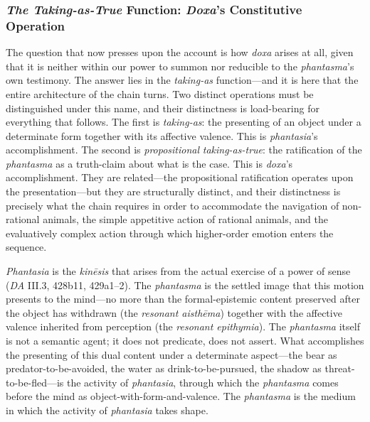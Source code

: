 \documentclass{article}
\begin{document}
\subsubsection*{\textit{The Taking-as-True} Function: \textit{Doxa}'s Constitutive Operation}

The question that now presses upon the account is how \textit{doxa} arises at all, given that it is neither within our power to summon nor reducible to the \textit{phantasma}'s own testimony. The answer lies in the \textit{taking-as} function---and it is here that the entire architecture of the chain turns. Two distinct operations must be distinguished under this name, and their distinctness is load-bearing for everything that follows. The first is \textit{taking-as}: the presenting of an object under a determinate form together with its affective valence. This is \textit{phantasia}'s accomplishment. The second is \textit{propositional} \textit{taking-as-true}: the ratification of the \textit{phantasma} as a truth-claim about what is the case. This is \textit{doxa}'s accomplishment. They are related---the propositional ratification operates upon the presentation---but they are structurally distinct, and their distinctness is precisely what the chain requires in order to accommodate the navigation of non-rational animals, the simple appetitive action of rational animals, and the evaluatively complex action through which higher-order emotion enters the sequence.

\textit{Phantasia} is the \textit{kinēsis} that arises from the actual exercise of a power of sense (\textit{DA} III.3, 428b11, 429a1--2). The \textit{phantasma} is the settled image that this motion presents to the mind---no more than the formal-epistemic content preserved after the object has withdrawn (the \textit{resonant aisthēma}) together with the affective valence inherited from perception (the \textit{resonant epithymia}). The \textit{phantasma} itself is not a semantic agent; it does not predicate, does not assert. What accomplishes the presenting of this dual content under a determinate aspect---the bear as predator-to-be-avoided, the water as drink-to-be-pursued, the shadow as threat-to-be-fled---is the activity of \textit{phantasia}, through which the \textit{phantasma} comes before the mind as object-with-form-and-valence. The \textit{phantasma} is the medium in which the activity of \textit{phantasia} takes shape.
\end{document}
